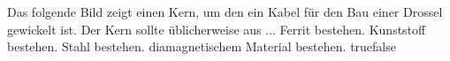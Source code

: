     {Das folgende Bild zeigt einen Kern, um den ein Kabel für den Bau einer Drossel gewickelt ist. Der Kern sollte üblicherweise aus ...}
    {Ferrit bestehen.}
    {Kunststoff bestehen.}
    {Stahl bestehen.}
    {diamagnetischem Material bestehen.}
    {true}{false}